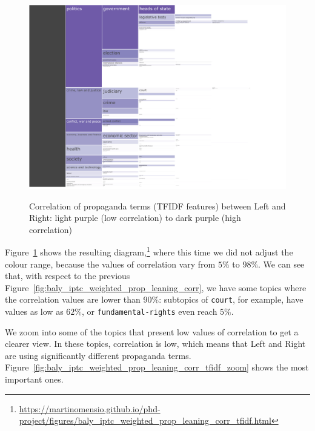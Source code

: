 \begin{figure}[!htbp]
    \centering
    \href{https://martinomensio.github.io/phd-project/figures/baly_iptc_weighted_prop_leaning_corr_tfidf.html}{\includegraphics[trim={2.65cm 0cm 2.8cm 0cm},clip,width=\linewidth]{figures/baly_iptc_weighted_prop_leaning_corr_tfidf.pdf}}
    \caption{Correlation of propaganda terms (TFIDF features) between Left and Right: light purple (low correlation) to dark purple (high correlation)}
    \label{fig:baly_iptc_weighted_prop_leaning_corr_tfidf}
\end{figure}

Figure~\ref{fig:baly_iptc_weighted_prop_leaning_corr_tfidf} shows the resulting diagram,\footnote{\url{https://martinomensio.github.io/phd-project/figures/baly_iptc_weighted_prop_leaning_corr_tfidf.html}} where this time we did not adjust the colour range, because the values of correlation vary from $5\%$ to $98\%$.
We can see that, with respect to the previous Figure~\ref{fig:baly_iptc_weighted_prop_leaning_corr}, we have some topics where the correlation values are lower than 90\%: subtopics of \texttt{court}, for example, have values as low as $62\%$, or \texttt{fundamental-rights} even reach $5\%$.

We zoom into some of the topics that present low values of correlation to get a clearer view. In these topics, correlation is low, which means that Left and Right are using significantly different propaganda terms. Figure~\ref{fig:baly_iptc_weighted_prop_leaning_corr_tfidf_zoom} shows the most important ones.

